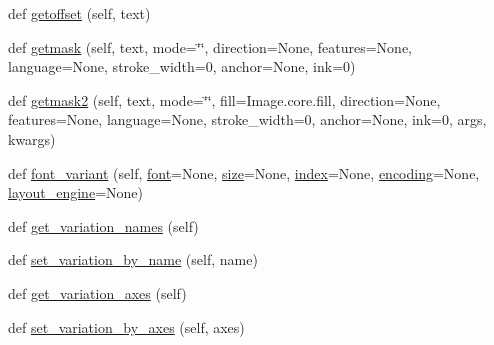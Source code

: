 \begin{DoxyCompactItemize}
\item 
def \hyperlink{classPIL_1_1ImageFont_1_1FreeTypeFont_aea7386ba126e1688fabaf68c5d7624d8}{getoffset} (self, text)
\item 
def \hyperlink{classPIL_1_1ImageFont_1_1FreeTypeFont_a3f9e384dff68e9d03985fa76c7c31a11}{getmask} (self, text, mode=\char`\"{}\char`\"{}, direction=None, features=None, language=None, stroke\+\_\+width=0, anchor=None, ink=0)
\item 
def \hyperlink{classPIL_1_1ImageFont_1_1FreeTypeFont_a5fa7c7e54b3a91de58b553e9b92c8f4c}{getmask2} (self, text, mode=\char`\"{}\char`\"{}, fill=Image.\+core.\+fill, direction=None, features=None, language=None, stroke\+\_\+width=0, anchor=None, ink=0, args, kwargs)
\item 
def \hyperlink{classPIL_1_1ImageFont_1_1FreeTypeFont_aede98e7391dd4301211d129bdbef59ff}{font\+\_\+variant} (self, \hyperlink{classPIL_1_1ImageFont_1_1FreeTypeFont_a85ce93d3087fb6dd43ae45b408880304}{font}=None, \hyperlink{classPIL_1_1ImageFont_1_1FreeTypeFont_a3f697fceb4923e030d9ef050648cd065}{size}=None, \hyperlink{classPIL_1_1ImageFont_1_1FreeTypeFont_a7fdae09aca4e12612ee730ae2667804f}{index}=None, \hyperlink{classPIL_1_1ImageFont_1_1FreeTypeFont_afeaea61a78a2a32629875ec53edf8596}{encoding}=None, \hyperlink{classPIL_1_1ImageFont_1_1FreeTypeFont_a05fc99625547b1cc0b20944f66909591}{layout\+\_\+engine}=None)
\item 
def \hyperlink{classPIL_1_1ImageFont_1_1FreeTypeFont_a750cbe6c5ab5602f0196c00bf483e4e0}{get\+\_\+variation\+\_\+names} (self)
\item 
def \hyperlink{classPIL_1_1ImageFont_1_1FreeTypeFont_a8e2aaa676c148e407504e81b82b14499}{set\+\_\+variation\+\_\+by\+\_\+name} (self, name)
\item 
def \hyperlink{classPIL_1_1ImageFont_1_1FreeTypeFont_aa15c3ae91540dcf56aec38d5fac5a88c}{get\+\_\+variation\+\_\+axes} (self)
\item 
def \hyperlink{classPIL_1_1ImageFont_1_1FreeTypeFont_af70c2b8a1eacf89d3a92f71fbb0ad88c}{set\+\_\+variation\+\_\+by\+\_\+axes} (self, axes)
\end{DoxyCompactItemize}
